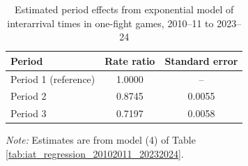 \begin{table}[!h]
\centering
\caption{Estimated period effects from exponential model of interarrival times in one-fight games, 2010--11 to 2023--24}
\label{tab:period_effects_20102011_20232024}

\begin{tabular}{lcc}
\toprule
Period & Rate ratio & Standard error \\
\midrule
Period 1 (reference) & 1.0000 & -- \\
Period 2 & 0.8745 & 0.0055 \\
Period 3 & 0.7197 & 0.0058 \\
\bottomrule
\end{tabular}

\vspace{0.4em}
\parbox{0.95\textwidth}{
\footnotesize
\textit{Note:} Estimates are from model (4) of Table \ref{tab:iat_regression_20102011_20232024}.
}
\end{table}
